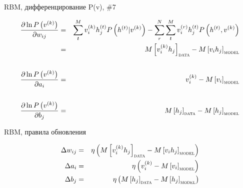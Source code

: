\documentclass[10pt]{beamer}
\begin{document}
\begin{frame}{RBM, дифференцирование P(v), \#7}

\begin{eqnarray*}
\frac{\partial \ln P\left(v^{(k)}\right)}{\partial w_{ij}} &=& \sum_t^M v_i^{(k)} h_j^{(t)} P\left( h^{(t)} | v^{(k)} \right) - \sum_r^N \sum_t^M v_i^{(r)} h_j^{(t)} P\left( h^{(t)}, v^{(k)} \right) \\
&=& M\left[v_i^{(k)} h_j \right]_{\textsc{data}} - M\left[v_i h_j\right]_{\textsc{model}} \\
& & \\
\frac{\partial \ln P\left(v^{(k)}\right)}{\partial a_{i}} &=& v_i^{(k)} - M\left[v_i\right]_{\textsc{model}} \\
& & \\
\frac{\partial \ln P\left(v^{(k)}\right)}{\partial b_{j}} &=& M\left[h_j \right]_{\textsc{data}} - M\left[h_j\right]_{\textsc{model}}
\end{eqnarray*}

\end{frame}


\begin{frame}{RBM, правила обновления}

\begin{eqnarray*}
\Delta w_{ij} &=& \eta\left( M\left[v_i^{(k)} h_j \right]_{\textsc{data}} - M\left[v_i h_j\right]_{\textsc{model}} \right) \\
\Delta a_i &=& \eta\left( v_i^{(k)} - M\left[v_i\right]_{\textsc{model}} \right) \\
\Delta b_j &=& \eta\left( M\left[h_j \right]_{\textsc{data}} - M\left[h_j\right]_{\textsc{model}} \right)
\end{eqnarray*}

\end{frame}
\end{document}

